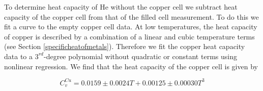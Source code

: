 To determine heat capacity of He without the copper cell we subtract heat capacity of the copper cell from that of the filled cell measurement.  To do this we fit a curve to the empty copper cell data.  At low temperatures, the heat capacity of copper is described by a combination of a linear and cubic temperature terms (see Section \ref{specificheatofmetals}).  Therefore we fit the copper heat capacity data to a $3^{rd}$-degree polynomial without  quadratic or constant terms using nonlinear regression.  We find that the heat capacity of the copper cell is given by
\begin{center}
\begin{equation}\label{eq:cufit}
C^{Cu}_{v} = 0.0159\pm0.0024 T+ 0.00125\pm0.00030 T^{3} 
\end{equation}
\end{center}

